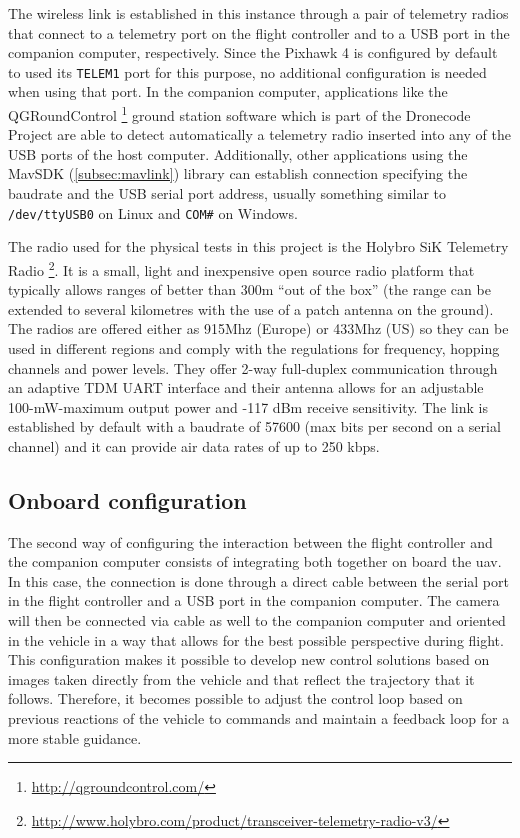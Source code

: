 The wireless link is established in this instance through a pair of telemetry radios that connect to a telemetry port on the flight controller and to a USB port in the companion computer, respectively.
Since the Pixhawk 4 is configured by default to used its \verb|TELEM1| port for this purpose, no additional configuration is needed when using that port.
In the companion computer, applications like the QGRoundControl \footnote{\url{http://qgroundcontrol.com/}} ground station software which is part of the Dronecode Project are able to detect automatically a telemetry radio inserted into any of the USB ports of the host computer.
Additionally, other applications using the MavSDK (\ref{subsec:mavlink}) library can establish connection specifying the baudrate and the USB serial port address, usually something similar to \verb|/dev/ttyUSB0| on Linux and \verb|COM#| on Windows.

The radio used for the physical tests in this project is the Holybro SiK Telemetry Radio \footnote{\url{http://www.holybro.com/product/transceiver-telemetry-radio-v3/}}.
It is a small, light and inexpensive open source radio platform that typically allows ranges of better than 300m “out of the box” (the range can be extended to several kilometres with the use of a patch antenna on the ground).
The radios are offered either as 915Mhz (Europe) or 433Mhz (US) so they can be used in different regions and comply with the regulations for frequency, hopping channels and power levels.
They offer 2-way full-duplex communication through an adaptive TDM UART interface and their antenna allows for an adjustable 100-mW-maximum output power and -117 dBm receive sensitivity.
The link is established by default with a baudrate of 57600 (max bits per second on a serial channel) and it can provide air data rates of up to 250 kbps.


\subsection{Onboard configuration}
\label{subsec:onboard}

The second way of configuring the interaction between the flight controller and the companion computer consists of integrating both together on board the \gls{uav}.
In this case, the connection is done through a direct cable between the serial port in the flight controller and a USB port in the companion computer.
The camera will then be connected via cable as well to the companion computer and oriented in the vehicle in a way that allows for the best possible perspective during flight.
This configuration makes it possible to develop new control solutions based on images taken directly from the vehicle and that reflect the trajectory that it follows.
Therefore, it becomes possible to adjust the control loop based on previous reactions of the vehicle to commands and maintain a feedback loop for a more stable guidance.

